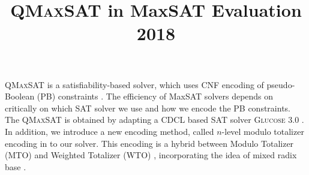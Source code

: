 \documentclass[conference]{IEEEtran}
\begin{document}
	
\title{\textsc{QMaxSAT} in MaxSAT Evaluation 2018}

\author{
}


% 


\maketitle

\textsc{QMaxSAT} is a  satisfiability-based solver, which uses CNF encoding of pseudo-Boolean (PB) 
constraints \cite{DBLP:journals/jsat/KoshimuraZFH12}. 
The efficiency of MaxSAT solvers depends on critically on which SAT solver we use 
and how we encode the PB constraints. The \textsc{QMaxSAT} is obtained by adapting a CDCL based 
SAT solver \textsc{Glucose 3.0} \cite{DBLP:conf/ijcai/AudemardS09,10.1007/978-3-540-24605-3_37}. 
In addition, we introduce a new encoding method, called $n$-level modulo 
totalizer encoding in to our solver. This encoding is a hybrid between Modulo Totalizer (MTO) 
\cite{DBLP:conf/ictai/OgawaLHKF13} and Weighted Totalizer (WTO) \cite{hayata2015weighted}, 
incorporating the idea of mixed radix base \cite{DBLP:conf/tacas/CodishFFS11}. 
\end{document}
